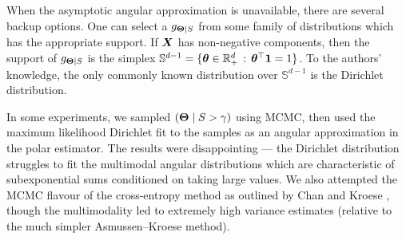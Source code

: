 


When the asymptotic angular approximation is unavailable, there are several backup options.
One can select a $g_{\bm{\Theta} \mid S}$ from some family of distributions which has the appropriate support.
If $\bm{X}$ has non-negative components, then the support of $g_{\bm{\Theta} \mid S}$ is the simplex
$ \mathbb{S}^{d-1} = \{ \bm{\theta} \in \mathbb{R}_+^d \, : \, \bm{\theta}^\top\bm{1} = 1 \}$.
To the authors' knowledge, the only commonly known distribution over $\mathbb{S}^{d-1}$ is the Dirichlet distribution.

In some experiments, we sampled $(\bm{\Theta} \mid S > \gamma)$ using MCMC, then used the maximum likelihood Dirichlet fit to the samples as an angular approximation in the polar estimator. The results were disappointing --- the Dirichlet distribution struggles to fit the multimodal angular distributions which are characteristic of subexponential sums conditioned on taking large values. We also attempted the MCMC flavour of the cross-entropy method as outlined by Chan and Kroese \cite{chan2012improved}, though the multimodality led to extremely high variance estimates (relative to the much simpler Asmussen--Kroese method).


